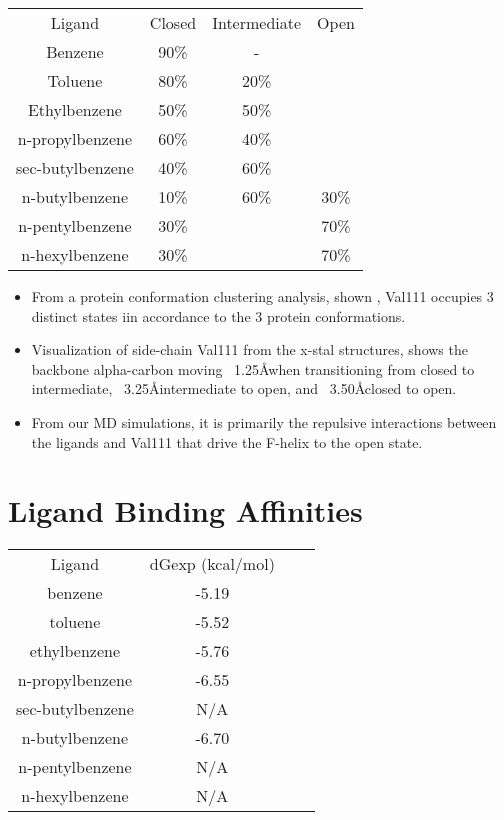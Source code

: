 \documentclass{article}
\begin{document}
   \begin{tabular}{|c|c|c|c|}
   \hline
    Ligand           & Closed & Intermediate & Open  \\
    Benzene          & 90\%   & -            &       \\
    Toluene          & 80\%   & 20\%         &       \\
    Ethylbenzene     & 50\%   & 50\%         &       \\
    n-propylbenzene  & 60\%   & 40\%         &       \\
    sec-butylbenzene & 40\%   & 60\%         &       \\
    n-butylbenzene   & 10\%   & 60\%         & 30\%  \\
    n-pentylbenzene  & 30\%   &              & 70\%  \\
    n-hexylbenzene   & 30\%   &              & 70\%  \\
    \hline
    \end{tabular}

    \begin{itemize}
    \item From a protein conformation clustering analysis, shown \cite{Merski2015}, Val111 occupies 3 distinct states iin accordance to the 3 protein conformations.
    \item Visualization of side-chain Val111 from the x-stal structures, shows the backbone alpha-carbon moving ~1.25\AA when transitioning from closed to intermediate, ~3.25\AA intermediate to open, and ~3.50\AA closed to open.
    \item From our MD simulations, it is primarily the repulsive interactions between the ligands and Val111 that drive the F-helix to the open state.
    \end{itemize}

\section{Ligand Binding Affinities}
   \begin{tabular}{|c|c|c|c|}
   \hline
    Ligand           & dGexp (kcal/mol) \\
    benzene          & -5.19            \\
    toluene          & -5.52            \\
    ethylbenzene     & -5.76            \\
    n-propylbenzene  & -6.55            \\
    sec-butylbenzene & N/A              \\
    n-butylbenzene   & -6.70            \\
    n-pentylbenzene  & N/A              \\
    n-hexylbenzene   & N/A              \\
    \hline
    \end{tabular}
\end{document}
